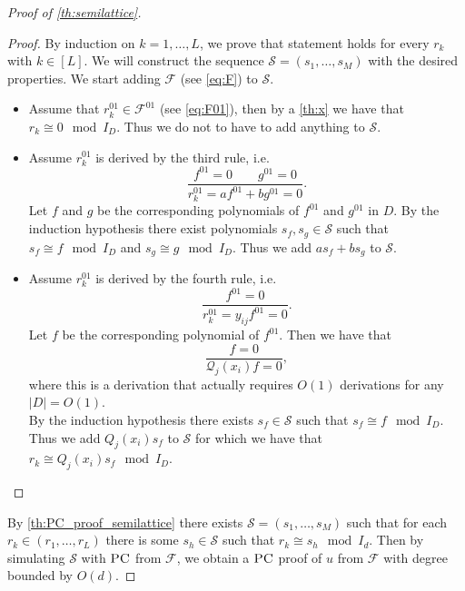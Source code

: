 \documentclass[11pt]{article}
\newcommand{\F}{\mathcal{F}}
\newcommand{\PC}{\textsc{PC}}
\newcommand{\1}{\textbf{1}}
\newcommand\q{\mathcal{Q}}
\begin{document}
\begin{proof} [Proof of \cref{th:semilattice}]
    \begin{proof}
        By induction on $k=1,\ldots,L$, we prove that statement holds for every $r_k$ with $k\in[L]$. We will construct the sequence $\mathcal{S} = (s_1, \dots, s_M)$ with the desired properties. We start adding $\mathcal{F}$ (see \cref{eq:F}) to $\mathcal{S}$.\\
        \begin{itemize}
            \item Assume that $r^{01}_k\in \F^{01}$ (see \cref{eq:F01}), then by a \cref{th:x} we have that $r_k \cong 0 \mod{I_D}$. Thus we do not to have to add anything to $\mathcal{S}$.
            \item Assume $r_k^{01}$ is derived by the third rule, i.e.
\begin{equation}
                    \frac{f^{01}=0 \qquad g^{01}=0}{r_k^{01}=a f^{01} + b g^{01} =0}. 
                \end{equation}
Let $f$ and $g$ be the corresponding polynomials of $f^ {01}$ and $g^{01}$ in $D$. By the induction hypothesis there exist polynomials $s_f, s_g \in \mathcal{S}$ such that $s_f \cong f \mod{I_D}$ and $s_g \cong g \mod{I_D}$. Thus we add $a s_f + b s_g$ to $\mathcal{S}$.
            \item Assume $r_k^{01}$ is derived by the fourth rule, i.e.
                \begin{equation*}\frac{f^{01}=0}{r_k^{01}=y_{ij}f^{01}=0}. 
                \end{equation*}
                Let $f$ be the corresponding polynomial of $f^{01}$. Then we have that 
                \begin{equation*}\frac{f=0}{\q_j(x_i)f=0},
                \end{equation*}
                where this is a derivation that actually requires $O(1)$ derivations for any $|D| = O(1)$.\\
                By the induction hypothesis there exists $s_f \in \mathcal{S}$ such that $s_f \cong f \mod{I_D}$. Thus we add $Q_j(x_i)s_f$ to $\mathcal{S}$ for which we have that $r_k \cong Q_j(x_i)s_f \mod{I_D}$.
            \end{itemize}
    \end{proof}
    
    By \cref{th:PC_proof_semilattice} there exists $\mathcal{S} = (s_1, \dots, s_M)$ such that for each $r_k \in (r_1, \dots, r_L)$ there is some $s_h \in \mathcal{S}$ such that $r_k \cong s_h \mod{I_d}$. Then by simulating $\mathcal{S}$ with $\PC$ from $\mathcal{F}$, we obtain a $\PC$ proof of $u$ from $\mathcal{F}$ with degree bounded by $O(d)$.
    
\end{proof}
\end{document}
